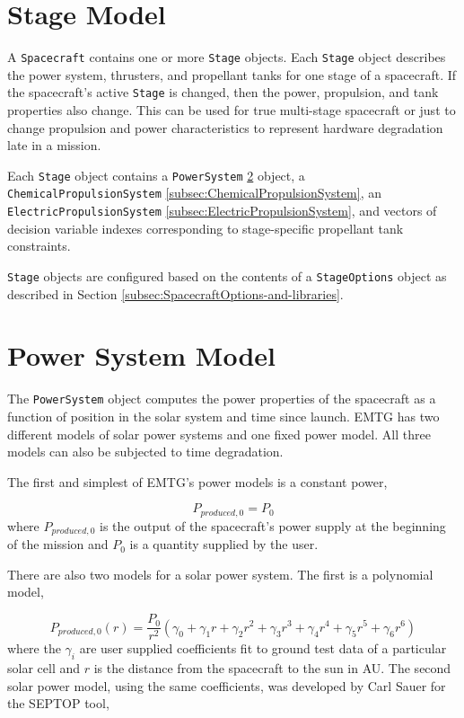 \section{Stage Model}
\label{sec:stage}

A \texttt{Spacecraft} contains one or more \texttt{Stage} objects. Each \texttt{Stage} object describes the power system, thrusters, and propellant tanks for one stage of a spacecraft. If the spacecraft's active \texttt{Stage} is changed, then the power, propulsion, and tank properties also change. This can be used for true multi-stage spacecraft or just to change propulsion and power characteristics to represent hardware degradation late in a mission.

Each \texttt{Stage} object contains a \texttt{PowerSystem} \ref{subsec:PowerSystem} object, a \texttt{ChemicalPropulsionSystem} \ref{subsec:ChemicalPropulsionSystem}, an \texttt{ElectricPropulsionSystem} \ref{subsec:ElectricPropulsionSystem}, and vectors of decision variable indexes corresponding to stage-specific propellant tank constraints. 

\texttt{Stage} objects are configured based on the contents of a \texttt{StageOptions} object as described in Section \ref{subsec:SpacecraftOptions-and-libraries}.

\section{Power System Model}
\label{subsec:PowerSystem}

The \texttt{PowerSystem} object computes the power properties of the spacecraft as a function of position in the solar system and time since launch. \ac{EMTG} has two different models of solar power systems and one fixed power model. All three models can also be subjected to time degradation.

The first and simplest of \ac{EMTG}'s power models is a constant power,

\begin{equation}
	P_{produced,0} = P_0
	\label{eq:constpower}
\end{equation}
%
where $P_{produced,0}$ is the output of the spacecraft's power supply at the beginning of the mission and $P_0$ is a quantity supplied by the user.

There are also two models for a solar power system. The first is a polynomial model,

\begin{equation}
	P_{produced,0}\left(r\right) = \frac{P_0}{r^2} \left(\gamma_0 + \gamma_1 r + \gamma_2 r^2 + \gamma_3 r^3 + \gamma_4 r^4 + \gamma_5 r^5 + \gamma_6 r^6\right)
	\label{eq:polypower}
\end{equation}
%
where the $\gamma_i$ are user supplied coefficients fit to ground test data of a particular solar cell and $r$ is the distance from the spacecraft to the sun in AU. The second solar power model, using the same coefficients, was developed by Carl Sauer for the SEPTOP tool,

